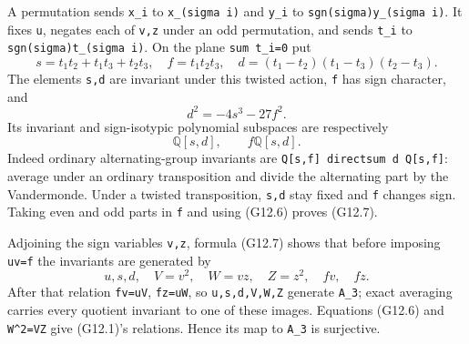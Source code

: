 \documentclass[
  10pt,
]{article}
\begin{document}
A permutation sends \texttt{\small x\_\allowbreak{}i} to
\texttt{\small x\_\allowbreak{}(\allowbreak{}sigma i)\allowbreak{}} and
\texttt{\small y\_\allowbreak{}i} to
\texttt{\small sgn(\allowbreak{}sigma)\allowbreak{}y\_\allowbreak{}(\allowbreak{}sigma i)\allowbreak{}}.
It fixes \texttt{\small u}, negates each of
\texttt{\small v,\allowbreak{}z} under an odd permutation, and sends
\texttt{\small t\_\allowbreak{}i} to
\texttt{\small sgn(\allowbreak{}sigma)\allowbreak{}t\_\allowbreak{}(\allowbreak{}sigma i)\allowbreak{}}.
On the plane \texttt{\small sum t\_\allowbreak{}i=\allowbreak{}0} put \[
s=t_1t_2+t_1t_3+t_2t_3,\quad f=t_1t_2t_3,\quad
d=(t_1-t_2)(t_1-t_3)(t_2-t_3).
\] The elements \texttt{\small s,\allowbreak{}d} are invariant under
this twisted action, \texttt{\small f} has sign character, and \[
d^2=-4s^3-27f^2.
\tag{G12.6}
\] Its invariant and sign-isotypic polynomial subspaces are respectively
\[
\mathbb Q[s,d],\qquad f\mathbb Q[s,d].
\tag{G12.7}
\] Indeed ordinary alternating-group invariants are
\texttt{\small Q[\allowbreak{}s,\allowbreak{}f]\allowbreak{} directsum d Q[\allowbreak{}s,\allowbreak{}f]\allowbreak{}}:
average under an ordinary transposition and divide the alternating part
by the Vandermonde. Under a twisted transposition,
\texttt{\small s,\allowbreak{}d} stay fixed and \texttt{\small f}
changes sign. Taking even and odd parts in \texttt{\small f} and using
(G12.6) proves (G12.7).

Adjoining the sign variables \texttt{\small v,\allowbreak{}z}, formula
(G12.7) shows that before imposing \texttt{\small uv=\allowbreak{}f} the
invariants are generated by \[
u,s,d,\quad V=v^2,\quad W=vz,\quad Z=z^2,\quad fv,\quad fz.
\] After that relation \texttt{\small fv=\allowbreak{}uV},
\texttt{\small fz=\allowbreak{}uW}, so
\texttt{\small u,\allowbreak{}s,\allowbreak{}d,\allowbreak{}V,\allowbreak{}W,\allowbreak{}Z}
generate \texttt{\small A\_\allowbreak{}3}; exact averaging carries
every quotient invariant to one of these images. Equations (G12.6) and
\texttt{\small W\textasciicircum{}2=\allowbreak{}VZ} give (G12.1)'s
relations. Hence its map to \texttt{\small A\_\allowbreak{}3} is
surjective.
\end{document}
